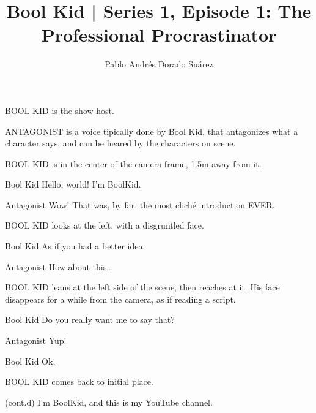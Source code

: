 \documentclass{screenplay}[2018/01/07]
\title{Bool Kid | Series 1, Episode 1: The Professional Procrastinator}
\author{Pablo Andrés Dorado Suárez}
\begin{document}
    \coverpage

    \fadein
    BOOL KID is the show host.

    ANTAGONIST is a voice tipically done by Bool Kid, that antagonizes what a
    character says, and can be heared by the characters on scene.



    BOOL KID is in the center of the camera frame, 1.5m away from it.

    \begin{dialogue}{Bool Kid}
        Hello, world! I'm BoolKid.
    \end{dialogue}

    \begin{dialogue}{Antagonist}
        Wow! That was, by far, the most cliché introduction EVER.
    \end{dialogue}

    BOOL KID looks at the left, with a disgruntled face.

    \begin{dialogue}{Bool Kid}
        As if you had a better idea.
    \end{dialogue}

    \begin{dialogue}{Antagonist}
        How about this\dots
    \end{dialogue}

    BOOL KID leans at the left side of the scene, then reaches at it. His face
    disappears for a while from the camera, as if reading a script.

    \begin{dialogue}{Bool Kid}
        Do you really want me to say that?
    \end{dialogue}

    \begin{dialogue}{Antagonist}
        Yup!
    \end{dialogue}

    \begin{dialogue}[sighing]{Bool Kid}
        Ok.
    \end{dialogue}


    BOOL KID comes back to initial place.

    \begin{dialogue}{(cont.d)}
        I'm BoolKid, and this is my YouTube channel.
    \end{dialogue}
\end{document}
